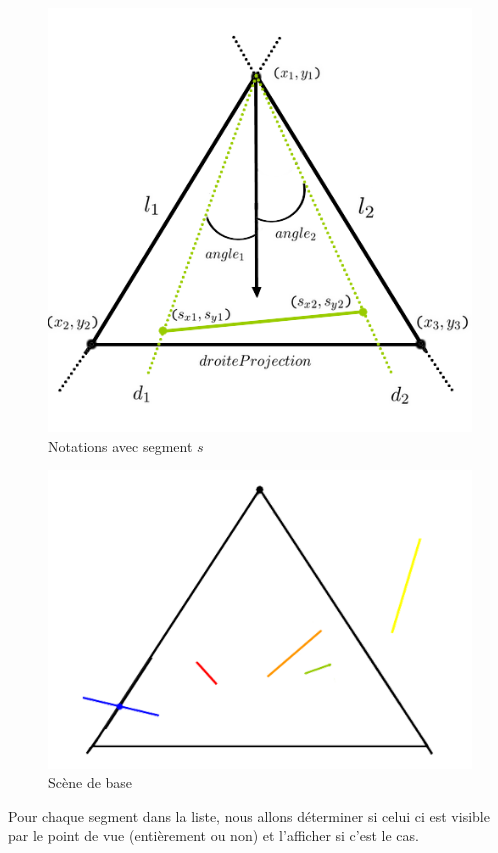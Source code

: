 \documentclass[11pt,a4paper]{article}
\theoremstyle{definition}
\theoremstyle{remark}
\begin{document}
\begin{figure}[!h]
\centering
\includegraphics[scale=0.4]{painter_notations_2.png}
\caption{Notations avec segment $s$}
\label{exp_1}
\end{figure}
\newline
\begin{figure}[!h]
\centering
\includegraphics[scale=0.4]{base.png}
\caption{Scène de base}
\label{exp_2}
\end{figure}

Pour chaque segment dans la liste, nous allons déterminer si celui ci est visible par le point de vue (entièrement ou non) et l'afficher si c'est le cas.
\end{document}
